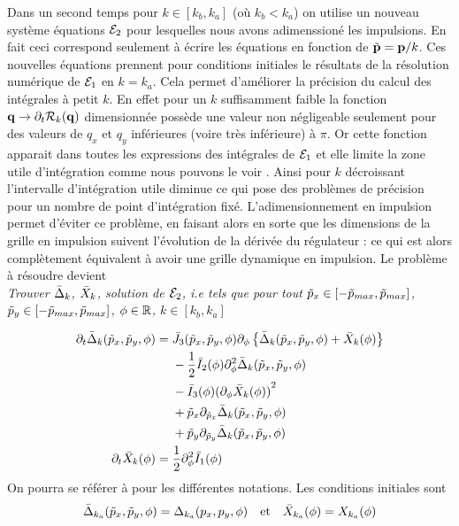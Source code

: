 \documentclass[10pt]{article}
\begin{document}
\begin{multicols}{2}
Dans un second temps pour $k \in [k_b, k_a]$ (où $k_b < k_a$) on utilise un nouveau système équations $\mathcal{E}_2$ pour lesquelles nous avons adimenssioné les impulsions. En fait ceci correspond seulement à écrire les équations en fonction de $\tilde{{\bf p}} = {\bf p}/k$. Ces nouvelles équations prennent pour conditions initiales le résultats de la résolution numérique de $\mathcal{E}_1$ en $k = k_a$. Cela permet d'améliorer la précision du calcul des intégrales à petit $k$. En effet pour un $k$ suffisamment faible la fonction ${\bf q} \to \partial_t \mathcal{R}_k({\bf q})$ dimensionnée possède une valeur non négligeable seulement pour des valeurs de $q_x$ et $q_y$ inférieures (voire très inférieure) à $\pi$. Or cette fonction apparait dans toutes les expressions des intégrales de $\mathcal{E}_1$ et elle limite la zone utile d'intégration comme nous pouvons le voir . Ainsi pour $k$ décroissant l'intervalle d'intégration utile diminue ce qui pose des problèmes de précision pour un nombre de point d'intégration fixé. L'adimensionnement en impulsion permet d'éviter ce problème, en faisant alors en sorte que les dimensions de la grille en impulsion suivent l'évolution de la dérivée du régulateur : ce qui est alors complètement équivalent à avoir une grille dynamique en impulsion. Le problème à résoudre devient \\


\noindent
{\itshape Trouver $\bar{\Delta}_k$, $\bar{X}_k$, solution de $\mathcal{E}_2$, i.e tels que pour tout $\tilde{p}_x \in [-\tilde{p}_{max}, \tilde{p}_{max}]$, $\tilde{p}_y \in [-\tilde{p}_{max}, \tilde{p}_{max}]$, $\phi \in \mathbb{R}$, $k\in [k_b, k_a]$}

\begin{align}
	\partial_t  \bar{\Delta}_k (\tilde{p}_x, \tilde{p}_y, \phi) & = 
	\begin{aligned}[t]
	&  \bar{J}_3(\tilde{p}_x, \tilde{p}_y, \phi) \partial_{\phi} \left\{ \bar{\Delta}_k (\tilde{p}_x, \tilde{p}_y, \phi) + \bar{X}_k(\phi) \right\} \\
	&  - \frac{1}{2} \bar{I}_2(\phi) \partial_{\phi}^2 \bar{\Delta}_k(\tilde{p}_x, \tilde{p}_y, \phi) \\
	& - \bar{I}_3(\phi){(\partial_{\phi} \bar{X}_k(\phi))}^2 \\
	& + \tilde{p}_x \partial_{\tilde{p}_x} \bar{\Delta}_k (\tilde{p}_x, \tilde{p}_y, \phi)  \\
	& + \tilde{p}_y \partial_{\tilde{p}_y}  \bar{\Delta}_k (\tilde{p}_x, \tilde{p}_y, \phi) 
	\end{aligned}
	\label{eqn} \\
	\partial_t \bar{X}_k(\phi) & = 
	\begin{aligned}[t]
		& \frac{1}{2} \partial_{\phi}^2 \bar{I}_1(\phi)
	\end{aligned}
\end{align}
On pourra se référer à  pour les différentes notations. Les conditions initiales sont
\begin{equation*}
\bar{\Delta}_{k_a}(\tilde{p}_x, \tilde{p}_y, \phi) = \Delta_{k_a}(p_x, p_y, \phi) \quad \text{et} \quad \bar{X}_{k_a}(\phi) = X_{k_a}(\phi)
\end{equation*}


\end{multicols}
\end{document}
